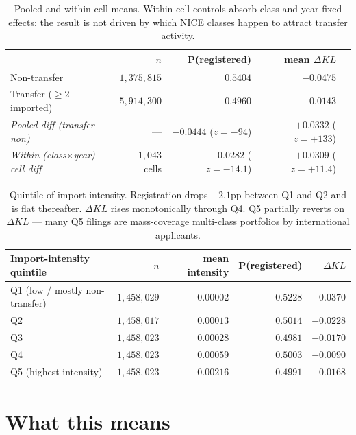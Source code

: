 \documentclass[11pt]{article}
\newcommand{\dkl}{\Delta KL}
\begin{document}
\vspace{-0.5em}
\begin{table}[h]
\centering
\small
\begin{tabular}{lrrrr}
\toprule
& $n$ & P(registered) & mean $\dkl$ & \\
\midrule
Non-transfer & $1{,}375{,}815$ & $0.5404$ & $-0.0475$ & \\
Transfer ($\geq 2$ imported) & $5{,}914{,}300$ & $0.4960$ & $-0.0143$ & \\
\midrule
\emph{Pooled diff (transfer $-$ non)}        & --- & $-0.0444$ ($z={-}94$) & $+0.0332$ ($z={+}133$) & \\
\emph{Within (class$\times$year) cell diff} & $1{,}043$ cells & $-0.0282$ ($z={-}14.1$) & $+0.0309$ ($z={+}11.4$) & \\
\bottomrule
\end{tabular}
\caption{Pooled and within-cell means. Within-cell controls absorb
class and year fixed effects: the result is not driven by which
NICE classes happen to attract transfer activity.}
\label{tab:transfer-pooled}
\end{table}

\begin{table}[h]
\centering
\small
\begin{tabular}{lrrrr}
\toprule
Import-intensity quintile & $n$ & mean intensity & P(registered) & $\dkl$ \\
\midrule
Q1 (low / mostly non-transfer)  & $1{,}458{,}029$ & $0.00002$ & $0.5228$ & $-0.0370$ \\
Q2                              & $1{,}458{,}017$ & $0.00013$ & $0.5014$ & $-0.0228$ \\
Q3                              & $1{,}458{,}023$ & $0.00028$ & $0.4981$ & $-0.0170$ \\
Q4                              & $1{,}458{,}023$ & $0.00059$ & $0.5003$ & $-0.0090$ \\
Q5 (highest intensity)          & $1{,}458{,}023$ & $0.00216$ & $0.4991$ & $-0.0168$ \\
\bottomrule
\end{tabular}
\caption{Quintile of import intensity. Registration drops $-2.1$pp
between Q1 and Q2 and is flat thereafter. $\dkl$ rises monotonically
through Q4. Q5 partially reverts on $\dkl$ --- many Q5 filings are
mass-coverage multi-class portfolios by international applicants.}
\label{tab:transfer-quintile}
\end{table}

\section*{What this means}
\end{document}
